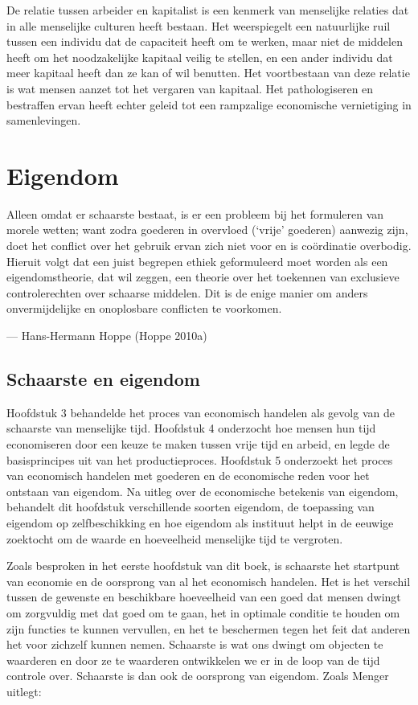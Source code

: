 \documentclass[
  a5paper,
  smalldemyvopaper,11pt,twoside,onecolumn,openright,extrafontsizes,
hidelinks]{memoir}
\begin{document}
De relatie tussen arbeider en kapitalist is een kenmerk van menselijke
relaties dat in alle menselijke culturen heeft bestaan. Het weerspiegelt
een natuurlijke ruil tussen een individu dat de capaciteit heeft om te
werken, maar niet de middelen heeft om het noodzakelijke kapitaal veilig
te stellen, en een ander individu dat meer kapitaal heeft dan ze kan of
wil benutten. Het voortbestaan van deze relatie is wat mensen aanzet tot
het vergaren van kapitaal. Het pathologiseren en bestraffen ervan heeft
echter geleid tot een rampzalige economische vernietiging in
samenlevingen.

\chapter{Eigendom}\label{sec-eigendom}

Alleen omdat er schaarste bestaat, is er een probleem bij het formuleren
van morele wetten; want zodra goederen in overvloed (`vrije' goederen)
aanwezig zijn, doet het conflict over het gebruik ervan zich niet voor
en is coördinatie overbodig. Hieruit volgt dat een juist begrepen ethiek
geformuleerd moet worden als een eigendomstheorie, dat wil zeggen, een
theorie over het toekennen van exclusieve controlerechten over schaarse
middelen. Dit is de enige manier om anders onvermijdelijke en
onoplosbare conflicten te voorkomen.

--- Hans-Hermann Hoppe (Hoppe 2010a)

\section{Schaarste en eigendom}\label{schaarste-en-eigendom}

Hoofdstuk 3 behandelde het proces van economisch handelen als gevolg van
de schaarste van menselijke tijd. Hoofdstuk 4 onderzocht hoe mensen hun
tijd economiseren door een keuze te maken tussen vrije tijd en arbeid,
en legde de basisprincipes uit van het productieproces. Hoofdstuk 5
onderzoekt het proces van economisch handelen met goederen en de
economische reden voor het ontstaan van eigendom. Na uitleg over de
economische betekenis van eigendom, behandelt dit hoofdstuk
verschillende soorten eigendom, de toepassing van eigendom op
zelfbeschikking en hoe eigendom als instituut helpt in de eeuwige
zoektocht om de waarde en hoeveelheid menselijke tijd te vergroten.

Zoals besproken in het eerste hoofdstuk van dit boek, is schaarste het
startpunt van economie en de oorsprong van al het economisch handelen.
Het is het verschil tussen de gewenste en beschikbare hoeveelheid van
een goed dat mensen dwingt om zorgvuldig met dat goed om te gaan, het in
optimale conditie te houden om zijn functies te kunnen vervullen, en het
te beschermen tegen het feit dat anderen het voor zichzelf kunnen nemen.
Schaarste is wat ons dwingt om objecten te waarderen en door ze te
waarderen ontwikkelen we er in de loop van de tijd controle over.
Schaarste is dan ook de oorsprong van eigendom. Zoals Menger uitlegt:
\end{document}

